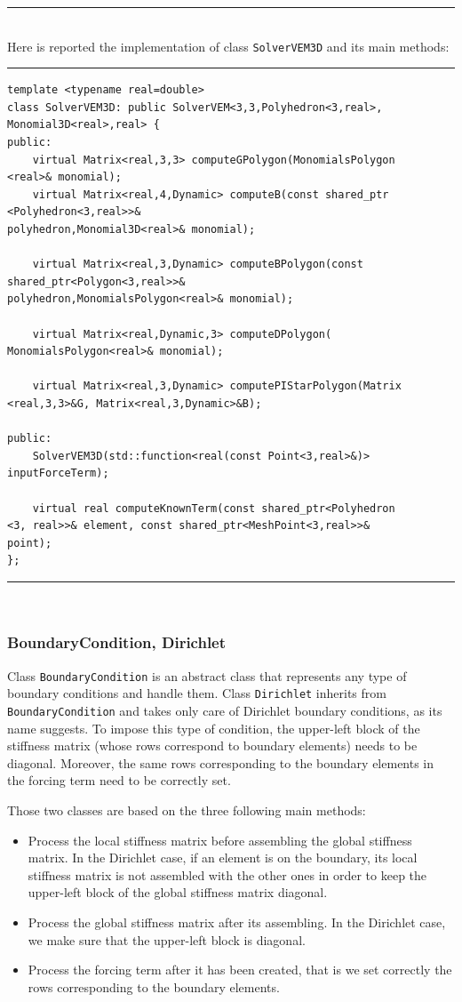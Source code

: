 \noindent\rule{16cm}{1pt}\\

Here is reported the implementation of class \verb|SolverVEM3D| and its main methods:

\noindent\rule{16cm}{1pt}
\begin{lstlisting}[caption=File \texttt{SolverVEM3D.h}]
template <typename real=double>
class SolverVEM3D: public SolverVEM<3,3,Polyhedron<3,real>,
Monomial3D<real>,real> {
public:
    virtual Matrix<real,3,3> computeGPolygon(MonomialsPolygon
<real>& monomial);
    virtual Matrix<real,4,Dynamic> computeB(const shared_ptr
<Polyhedron<3,real>>& 
polyhedron,Monomial3D<real>& monomial);

    virtual Matrix<real,3,Dynamic> computeBPolygon(const 
shared_ptr<Polygon<3,real>>& 
polyhedron,MonomialsPolygon<real>& monomial);

    virtual Matrix<real,Dynamic,3> computeDPolygon(
MonomialsPolygon<real>& monomial);
		
    virtual Matrix<real,3,Dynamic> computePIStarPolygon(Matrix
<real,3,3>&G, Matrix<real,3,Dynamic>&B);
	
public:
    SolverVEM3D(std::function<real(const Point<3,real>&)> 
inputForceTerm);
 
    virtual real computeKnownTerm(const shared_ptr<Polyhedron
<3, real>>& element, const shared_ptr<MeshPoint<3,real>>& 
point);	
};

\end{lstlisting}
\noindent\rule{16cm}{1pt}\\

\subsubsection{BoundaryCondition, Dirichlet}
Class \verb|BoundaryCondition| is an abstract class that represents any type of boundary conditions and handle them. Class \verb|Dirichlet| inherits from \verb|BoundaryCondition| and takes only care of Dirichlet boundary conditions, as its name suggests. To impose this type of condition, the upper-left block of the stiffness matrix (whose rows correspond to boundary elements) needs to be diagonal. Moreover, the same rows corresponding to the boundary elements in the forcing term need to be correctly set. 

Those two classes are based on the three following main methods: 
\begin{itemize}
\item Process the local stiffness matrix before assembling the global stiffness matrix. In the Dirichlet case, if an element is on the boundary, its local stiffness matrix is not assembled with the other ones in order to keep the upper-left block of the global stiffness matrix diagonal. 
\item Process the global stiffness matrix after its assembling. In the Dirichlet case, we make sure that the upper-left block is diagonal. 
\item Process the forcing term after it has been created, that is we set correctly the rows corresponding to the boundary elements. 
\end{itemize}

